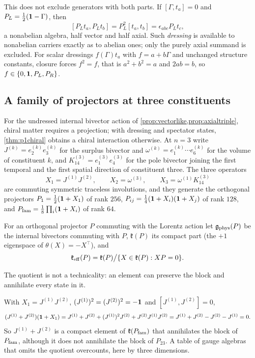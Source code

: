 This does not exclude generators with both parts. If $[\Gamma,t_a]=0$ and $P_L=\tfrac12(\mathbf 1-\Gamma)$, then
\[
[P_Lt_a,P_Lt_b]=P_L^2[t_a,t_b]=\epsilon_{abc}P_Lt_c ,
\]
a nonabelian algebra, half vector and half axial. Such \emph{dressing} is available to nonabelian carriers exactly as to abelian ones;
only the purely axial summand is excluded. For scalar dressings $f(\Gamma)t_a$ with $f=a+b\Gamma$ and unchanged structure constants,
closure forces $f^2=f$, that is $a^2+b^2=a$ and $2ab=b$, so $f\in\{0,\mathbf 1,P_L,P_R\}$.

\subsection{A family of projectors at three constituents}

For the undressed internal bivector action of \cref{prop:vectorlike,prop:axialtriple}, chiral matter requires a projection; with dressing and
spectator states, \cref{thm:p1chiral} obtains a chiral interaction otherwise. At $n=3$ write $J^{(k)}=e^{(k)}_2e^{(k)}_3$ for the surplus bivector and
$\omega^{(k)}=e^{(k)}_1\cdots e^{(k)}_6$ for the volume of constituent $k$, and $K^{(3)}_{14}=e^{(3)}_1e^{(3)}_4$ for the pole bivector
joining the first temporal and the first spatial direction of constituent three. The three operators
\[
X_1=J^{(1)}J^{(2)},\qquad X_2=\omega^{(3)},\qquad X_3=\omega^{(1)}K^{(3)}_{14}
\]
are commuting symmetric traceless involutions, and they generate the orthogonal projectors $P_1=\tfrac12(\mathbf 1+X_1)$ of rank $256$,
$P_{ij}=\tfrac14(\mathbf 1+X_i)(\mathbf 1+X_j)$ of rank $128$, and $P_{\rm fam}=\tfrac18\prod_i(\mathbf 1+X_i)$ of rank $64$.

\begin{definition}
\label{def:keff}
For an orthogonal projector $P$ commuting with the Lorentz action let $\mathfrak g_{\rm phys}(P)$ be the internal bivectors commuting
with $P$, $\mathfrak k(P)$ its compact part (the $+1$ eigenspace of $\theta(X)=-X^{\!\top}$), and
\[
\mathfrak k_{\rm eff}(P)=\mathfrak k(P)\big/\{X\in\mathfrak k(P):XP=0\}.
\]
\end{definition}

The quotient is not a technicality: an element can preserve the block and annihilate every state in it.

\begin{example}[An annihilator]
\label{ex:annihilator}
With $X_1=J^{(1)}J^{(2)}$, $(J^{(1)})^2=(J^{(2)})^2=-\mathbf 1$ and $[J^{(1)},J^{(2)}]=0$,
\[
(J^{(1)}+J^{(2)})(\mathbf 1+X_1)=J^{(1)}+J^{(2)}+(J^{(1)})^2J^{(2)}+J^{(2)}J^{(1)}J^{(2)}=J^{(1)}+J^{(2)}-J^{(2)}-J^{(1)}=0 .
\]
So $J^{(1)}+J^{(2)}$ is a compact element of $\mathfrak k(P_{\rm fam})$ that annihilates the block of $P_{\rm fam}$, although it does not annihilate the
block of $P_{23}$. A table of gauge algebras that omits the quotient overcounts, here by three dimensions.
\end{example}

